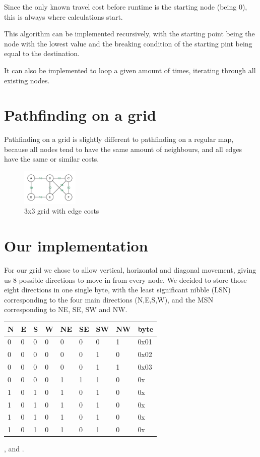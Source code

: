 Since the only known travel cost before runtime is the starting node (being 0),
this is always where calculations start.

This algorithm can be implemented recursively,
with the starting point being the node with the lowest value
and the breaking condition of the starting pint being equal to the destination.

It can also be implemented to loop a given amount of times,
iterating through all existing nodes.

\section{Pathfinding on a grid}
Pathfinding on a grid is slightly different to pathfinding on a regular map,
because all nodes tend to have the same amount of neighbours,
and all edges have the same or similar costs.
\begin{figure}[htp]
	\centering
	\includegraphics[width=0.24\textwidth]{figures/path/graph_values}
	\caption{3x3 grid with edge costs}
	\label{fig:graph_cost}
\end{figure}


\section{Our implementation}
For our grid we chose to allow vertical, horizontal and diagonal movement,
giving us 8 possible directions to move in from every node.
We decided to store those eight directions in one single byte,
with the least significant nibble (LSN) corresponding to the four main directions (N,E,S,W),
and the MSN corresponding to NE, SE, SW and NW.

\begin{center}
	\begin{tabular}{|*{8}{m{0.6cm}|}|l|}
		\hline
		N & E& S& W& NE& SE& SW& NW& byte\\
		\hline
		0 & 0 & 0 & 0 & 0 & 0 & 0 & 1 & 0x01\\
		0 & 0 & 0 & 0 & 0 & 0 & 1 & 0 & 0x02\\
		0 & 0 & 0 & 0 & 0 & 0 & 1 & 1 & 0x03\\
		0 & 0 & 0 & 0 & 1 & 1 & 1 & 0 & 0x\\
		\hline
		1 & 0 & 1 & 0 & 1 & 0 & 1 & 0 & 0x\\
		1 & 0 & 1 & 0 & 1 & 0 & 1 & 0 & 0x\\
		1 & 0 & 1 & 0 & 1 & 0 & 1 & 0 & 0x\\
		1 & 0 & 1 & 0 & 1 & 0 & 1 & 0 & 0x\\
		\hline
	\end{tabular}
\end{center}



\cite{Madsen2010}, \cite{Oetiker2010} and \cite{Mittelbach2005}.
